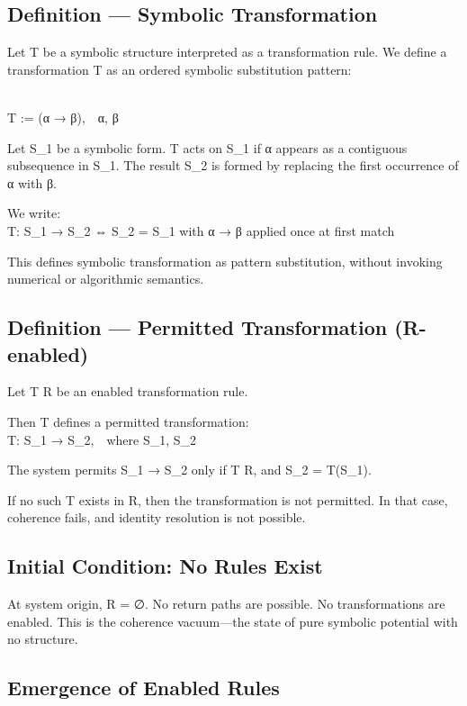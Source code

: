 \subsection{Definition --- Symbolic
Transformation}\label{definition-symbolic-transformation}

Let T \in \Sigma* be a symbolic structure interpreted as a transformation rule.
We define a transformation T as an ordered symbolic substitution
pattern:\\
\strut \\
T := (α → β), α, β \in \Sigma*

Let S_1 \in \Sigma* be a symbolic form. T acts on S_1 if α appears as a
contiguous subsequence in S_1. The result S_2 is formed by replacing the
first occurrence of α with β.

We write:\\
T: S_1 → S_2 ⇔ S_2 = S_1 with α → β applied once at first match

This defines symbolic transformation as pattern substitution, without
invoking numerical or algorithmic semantics.

\subsection{Definition --- Permitted Transformation
(R-enabled)}\label{definition-permitted-transformation-r-enabled}

Let T \in R be an enabled transformation rule.

Then T defines a permitted transformation:\\
T: S_1 → S_2, where S_1, S_2 \in \Sigma*

The system permits S_1 → S_2 only if T \in R, and S_2 = T(S_1).

If no such T exists in R, then the transformation is not permitted. In
that case, coherence fails, and identity resolution is not possible.

\subsection{Initial Condition: No Rules
Exist}\label{initial-condition-no-rules-exist}

At system origin, R = ∅. No return paths are possible. No
transformations are enabled. This is the coherence vacuum---the state of
pure symbolic potential with no structure.

\subsection{Emergence of Enabled
Rules}\label{emergence-of-enabled-rules}


